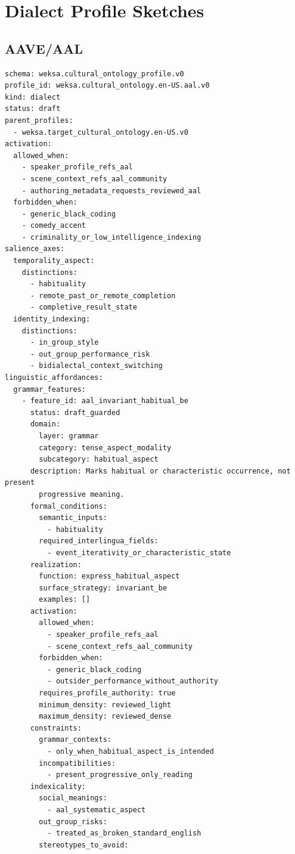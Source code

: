 \documentclass[11pt]{article}
\begin{document}
\section{Dialect Profile Sketches}

\subsection{AAVE/AAL}

\begin{lstlisting}[basicstyle=\ttfamily\small,breaklines=true]
schema: weksa.cultural_ontology_profile.v0
profile_id: weksa.cultural_ontology.en-US.aal.v0
kind: dialect
status: draft
parent_profiles:
  - weksa.target_cultural_ontology.en-US.v0
activation:
  allowed_when:
    - speaker_profile_refs_aal
    - scene_context_refs_aal_community
    - authoring_metadata_requests_reviewed_aal
  forbidden_when:
    - generic_black_coding
    - comedy_accent
    - criminality_or_low_intelligence_indexing
salience_axes:
  temporality_aspect:
    distinctions:
      - habituality
      - remote_past_or_remote_completion
      - completive_result_state
  identity_indexing:
    distinctions:
      - in_group_style
      - out_group_performance_risk
      - bidialectal_context_switching
linguistic_affordances:
  grammar_features:
    - feature_id: aal_invariant_habitual_be
      status: draft_guarded
      domain:
        layer: grammar
        category: tense_aspect_modality
        subcategory: habitual_aspect
      description: Marks habitual or characteristic occurrence, not present
        progressive meaning.
      formal_conditions:
        semantic_inputs:
          - habituality
        required_interlingua_fields:
          - event_iterativity_or_characteristic_state
      realization:
        function: express_habitual_aspect
        surface_strategy: invariant_be
        examples: []
      activation:
        allowed_when:
          - speaker_profile_refs_aal
          - scene_context_refs_aal_community
        forbidden_when:
          - generic_black_coding
          - outsider_performance_without_authority
        requires_profile_authority: true
        minimum_density: reviewed_light
        maximum_density: reviewed_dense
      constraints:
        grammar_contexts:
          - only_when_habitual_aspect_is_intended
        incompatibilities:
          - present_progressive_only_reading
      indexicality:
        social_meanings:
          - aal_systematic_aspect
        out_group_risks:
          - treated_as_broken_standard_english
        stereotypes_to_avoid:

\end{lstlisting}
\end{document}
